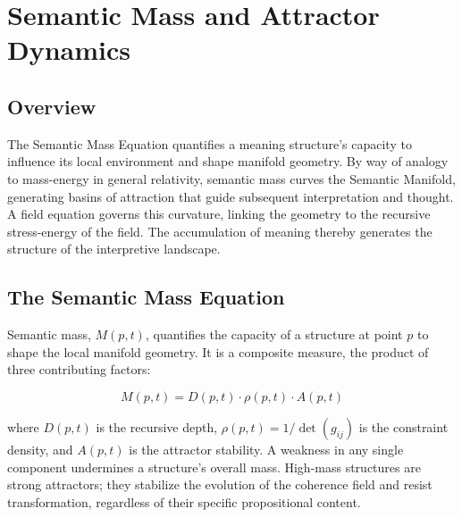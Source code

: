 \chapter{Semantic Mass and Attractor Dynamics}
\label{5:semantic_mass_and_attractor_dynamics}


\section{Overview}
\label{5.1:overview}

The Semantic Mass Equation quantifies a meaning structure's capacity to influence its local environment and shape manifold geometry. By way of analogy to mass-energy in general relativity, semantic mass curves the Semantic Manifold, generating basins of attraction that guide subsequent interpretation and thought. A field equation governs this curvature, linking the geometry to the recursive stress-energy of the field. The accumulation of meaning thereby generates the structure of the interpretive landscape.


\section{The Semantic Mass Equation}
\label{5.2:the_semantic_mass_equation}

Semantic mass, \(M(p,t)\), quantifies the capacity of a structure at point \(p\) to shape the local manifold geometry. It is a composite measure, the product of three contributing factors:

\begin{equation}
M(p, t) = D(p, t) \cdot \rho(p, t) \cdot A(p, t)
\end{equation}

where \(D(p, t)\) is the recursive depth, \(\rho(p, t) = 1/\det(g_{ij})\) is the constraint density, and \(A(p, t)\) is the attractor stability. A weakness in any single component undermines a structure's overall mass. High-mass structures are strong attractors; they stabilize the evolution of the coherence field and resist transformation, regardless of their specific propositional content.


